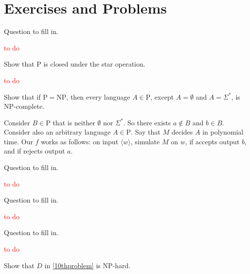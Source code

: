 \section*{Exercises and Problems}

\setcounter{exercise}{12}

\begin{exercise}
  Question to fill in.
\end{exercise}

\textcolor{red}{to do}

\setcounter{exercise}{14}

\begin{exercise}
  Show that P is closed under the star operation.
\end{exercise}

\textcolor{red}{to do}

\setcounter{exercise}{17}

\begin{exercise}
  Show that if $\mathrm{P}=\mathrm{NP}$, then every language $A\in \mathrm{P}$, except $A=\emptyset$ and $A=\Sigma^*$, is NP-complete.
\end{exercise}

Consider $B\in \mathrm{P}$ that is neither $\emptyset$ nor $\Sigma^*$. So there exists $a\notin B$ and $b\in B$. Consider also an arbitrary language $A\in \mathrm{P}$. Say that $M$ decides $A$ in polynomial time. Our $f$ works as follows: on input $\langle w\rangle$, simulate $M$ on $w$, if accepts output $b$, and if rejects output $a$.

\setcounter{exercise}{25}

\begin{exercise}
  Question to fill in.
\end{exercise}

\textcolor{red}{to do}

\begin{exercise}
  Question to fill in.
\end{exercise}

\textcolor{red}{to do}

\begin{exercise}
  Question to fill in.
\end{exercise}

\textcolor{red}{to do}


\setcounter{exercise}{33}

\begin{exercise}
  Show that $D$ in \ref{10thproblem} is NP-hard.
\end{exercise}

